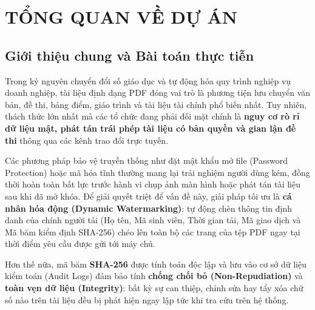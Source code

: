 \documentclass[12pt,a4paper]{report}
\begin{document}
\tableofcontents
\newpage

\chapter{TỔNG QUAN VỀ DỰ ÁN}

\section{Giới thiệu chung và Bài toán thực tiễn}
Trong kỷ nguyên chuyển đổi số giáo dục và tự động hóa quy trình nghiệp vụ doanh nghiệp, tài liệu định dạng PDF đóng vai trò là phương tiện lưu chuyển văn bản, đề thi, bảng điểm, giáo trình và tài liệu tài chính phổ biến nhất. Tuy nhiên, thách thức lớn nhất mà các tổ chức đang phải đối mặt chính là \textbf{nguy cơ rò rỉ dữ liệu mật, phát tán trái phép tài liệu có bản quyền và gian lận đề thi} thông qua các kênh trao đổi trực tuyến.

Các phương pháp bảo vệ truyền thống như đặt mật khẩu mở file (Password Protection) hoặc mã hóa tĩnh thường mang lại trải nghiệm người dùng kém, đồng thời hoàn toàn bất lực trước hành vi chụp ảnh màn hình hoặc phát tán tài liệu sau khi đã mở khóa. Để giải quyết triệt để vấn đề này, giải pháp tối ưu là \textbf{cá nhân hóa động (Dynamic Watermarking)}: tự động chèn thông tin định danh của chính người tải (Họ tên, Mã sinh viên, Thời gian tải, Mã giao dịch và Mã băm kiểm định SHA-256) chéo lên toàn bộ các trang của tệp PDF ngay tại thời điểm yêu cầu được gửi tới máy chủ.

Hơn thế nữa, mã băm \textbf{SHA-256} được tính toán độc lập và lưu vào cơ sở dữ liệu kiểm toán (Audit Logs) đảm bảo tính \textbf{chống chối bỏ (Non-Repudiation)} và \textbf{toàn vẹn dữ liệu (Integrity)}: bất kỳ sự can thiệp, chỉnh sửa hay tẩy xóa chữ số nào trên tài liệu đều bị phát hiện ngay lập tức khi tra cứu trên hệ thống.
\end{document}

